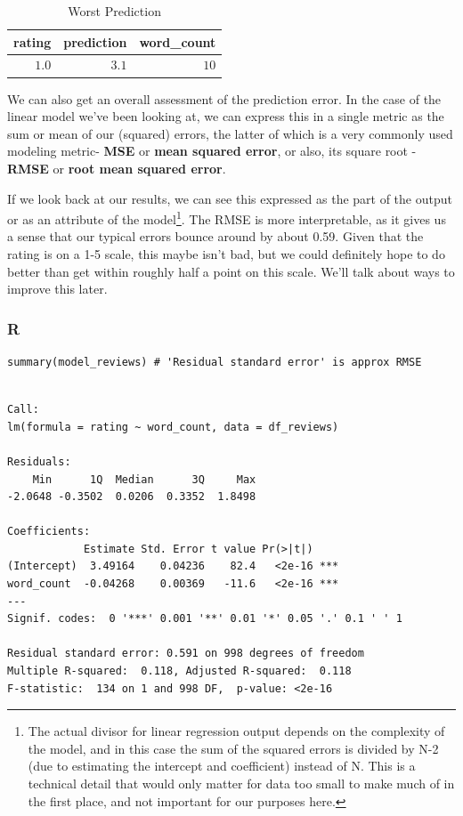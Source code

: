 \documentclass[
  letterpaper,
]{krantz}
\begin{document}
\hypertarget{tbl-worst-prediction}{}
\begin{longtable}{rrr}
\caption{\label{tbl-worst-prediction}Worst Prediction }\tabularnewline

\toprule
rating & prediction & word\_count \\ 
\midrule\addlinespace[2.5pt]
\textcolor[HTML]{404040}{$1.0$} & \textcolor[HTML]{404040}{$3.1$} & \textcolor[HTML]{404040}{$10$} \\ 
\bottomrule
\end{longtable}

We can also get an overall assessment of the prediction error. In the
case of the linear model we've been looking at, we can express this in a
single metric as the sum or mean of our (squared) errors, the latter of
which is a very commonly used modeling metric- \textbf{MSE} or
\textbf{mean squared error}, or also, its square root - \textbf{RMSE} or
\textbf{root mean squared error}.

If we look back at our results, we can see this expressed as the part of
the output or as an attribute of the model\footnote{The actual divisor
  for linear regression output depends on the complexity of the model,
  and in this case the sum of the squared errors is divided by N-2 (due
  to estimating the intercept and coefficient) instead of N. This is a
  technical detail that would only matter for data too small to make
  much of in the first place, and not important for our purposes here.}.
The RMSE is more interpretable, as it gives us a sense that our typical
errors bounce around by about 0.59. Given that the rating is on a 1-5
scale, this maybe isn't bad, but we could definitely hope to do better
than get within roughly half a point on this scale. We'll talk about
ways to improve this later.

\subsubsection{R}

\begin{verbatim}
summary(model_reviews) # 'Residual standard error' is approx RMSE
\end{verbatim}

\begin{verbatim}

Call:
lm(formula = rating ~ word_count, data = df_reviews)

Residuals:
    Min      1Q  Median      3Q     Max 
-2.0648 -0.3502  0.0206  0.3352  1.8498 

Coefficients:
            Estimate Std. Error t value Pr(>|t|)    
(Intercept)  3.49164    0.04236    82.4   <2e-16 ***
word_count  -0.04268    0.00369   -11.6   <2e-16 ***
---
Signif. codes:  0 '***' 0.001 '**' 0.01 '*' 0.05 '.' 0.1 ' ' 1

Residual standard error: 0.591 on 998 degrees of freedom
Multiple R-squared:  0.118, Adjusted R-squared:  0.118 
F-statistic:  134 on 1 and 998 DF,  p-value: <2e-16
\end{verbatim}
\end{document}
